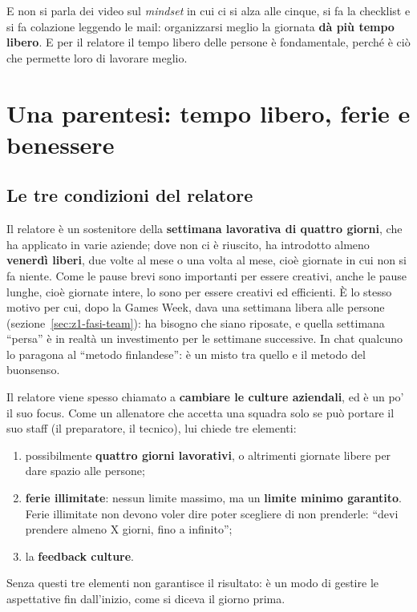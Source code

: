 E non si parla dei video sul \emph{mindset} in cui ci si alza alle cinque, si fa la
checklist e si fa colazione leggendo le mail: organizzarsi meglio la giornata
\textbf{dà più tempo libero}. E per il relatore il tempo libero delle persone è
fondamentale, perché è ciò che permette loro di lavorare meglio.

\section{Una parentesi: tempo libero, ferie e benessere}
\label{sec:z2-benessere}

\subsection{Le tre condizioni del relatore}

Il relatore è un sostenitore della \textbf{settimana lavorativa di quattro giorni},
che ha applicato in varie aziende; dove non ci è riuscito, ha introdotto almeno
\textbf{venerdì liberi}, due volte al mese o una volta al mese, cioè giornate in
cui non si fa niente. Come le pause brevi sono importanti per essere creativi,
anche le pause lunghe, cioè giornate intere, lo sono per essere creativi ed
efficienti. È lo stesso motivo per cui, dopo la Games Week, dava una settimana
libera alle persone (sezione~\ref{sec:z1-fasi-team}): ha bisogno che siano
riposate, e quella settimana ``persa'' è in realtà un investimento per le
settimane successive. In chat qualcuno lo paragona al ``metodo finlandese'': è un
misto tra quello e il metodo del buonsenso.

Il relatore viene spesso chiamato a \textbf{cambiare le culture aziendali}, ed è un
po' il suo focus. Come un allenatore che accetta una squadra solo se può portare il
suo staff (il preparatore, il tecnico), lui chiede tre elementi:
\begin{enumerate}
  \item possibilmente \textbf{quattro giorni lavorativi}, o altrimenti giornate
        libere per dare spazio alle persone;
  \item \textbf{ferie illimitate}: nessun limite massimo, ma un \textbf{limite
        minimo garantito}. Ferie illimitate non devono voler dire poter scegliere
        di non prenderle: ``devi prendere almeno X giorni, fino a infinito'';
  \item la \textbf{feedback culture}.
\end{enumerate}
Senza questi tre elementi non garantisce il risultato: è un modo di gestire le
aspettative fin dall'inizio, come si diceva il giorno prima.


